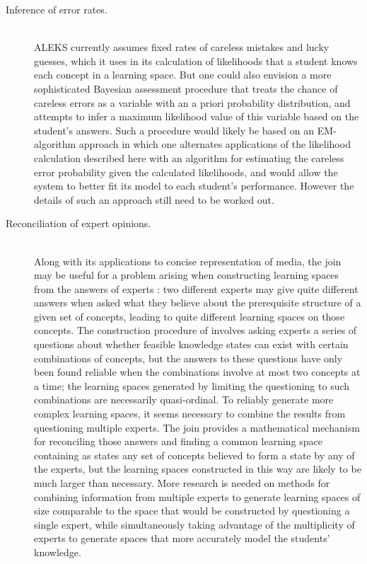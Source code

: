 \documentclass[11pt]{llncs}
\begin{document}
{\begin{description}
\item[Inference of error rates.] \hfill\\
ALEKS  currently assumes fixed rates of careless mistakes and lucky guesses, which it uses in its calculation of likelihoods that a student knows each concept in a learning space. But one could also envision a more sophisticated Bayesian assessment procedure that treats the chance of careless errors as a variable with an a priori probability distribution, and attempts to infer a maximum likelihood value of this variable based on the student's answers. Such a procedure would likely be based on an EM-algorithm approach in which one alternates applications of the likelihood calculation described here with an algorithm for estimating the careless error probability given the calculated likelihoods, and would allow the system to better fit its model to each student's performance. However the details of such an approach still need to be worked out.

\item[Reconciliation of expert opinions.] \hfill\\
Along with its applications to concise representation of media, the join may be useful for a problem arising when constructing learning spaces from the answers of experts \citep{dowling:93a}: two different experts may give quite different answers when asked what they believe about the prerequisite structure of a given set of concepts, leading to quite different learning spaces on those concepts. The construction procedure of \citet{dowling:93a} involves asking experts a series of questions about whether feasible knowledge states can exist with certain combinations of concepts, but the answers to these questions have only been found reliable when the combinations involve at most two concepts at a time; the learning spaces generated by limiting the questioning to such combinations are necessarily quasi-ordinal.  To reliably generate more complex learning spaces, it seems necessary to combine the results from questioning multiple experts.
The join provides a mathematical mechanism for reconciling those answers and finding a common learning space containing as states any set of concepts believed to form a state by any of the experts,
but the learning spaces constructed in this way are likely to be much larger than necessary.
More research is needed on methods for combining information from multiple experts to generate learning spaces of size comparable to the space that would be constructed by questioning a single expert, while simultaneously taking advantage of the multiplicity of experts to generate spaces that more accurately model the students' knowledge.


\end{description}}
\end{document}
